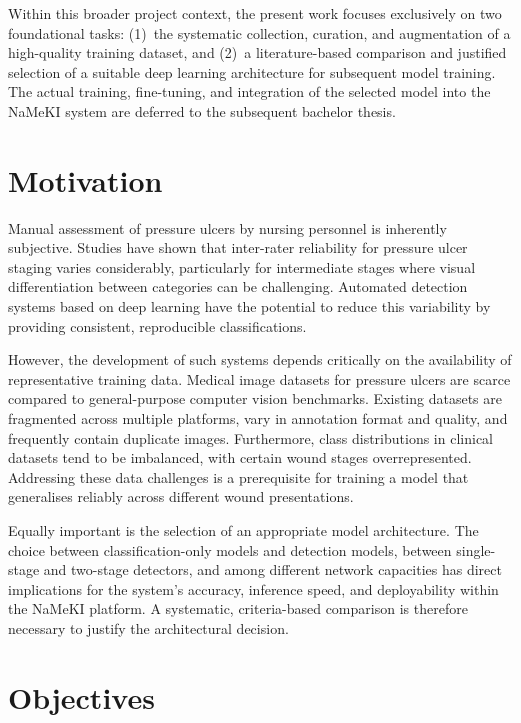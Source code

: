 \documentclass[a4paper,12pt,twoside]{report}
\begin{document}
Within this broader project context, the present work focuses exclusively on two
foundational tasks: (1)~the systematic collection, curation, and augmentation of
a high-quality training dataset, and (2)~a literature-based comparison and
justified selection of a suitable deep learning architecture for subsequent model
training. The actual training, fine-tuning, and integration of the selected model
into the NaMeKI system are deferred to the subsequent bachelor thesis.

\section{Motivation}
\label{sec:motivation}

Manual assessment of pressure ulcers by nursing personnel is inherently
subjective. Studies have shown that inter-rater reliability for pressure ulcer
staging varies considerably, particularly for intermediate stages where visual
differentiation between categories can be challenging. Automated detection
systems based on deep learning have the potential to reduce this variability by
providing consistent, reproducible classifications.

However, the development of such systems depends critically on the availability
of representative training data. Medical image datasets for pressure ulcers are
scarce compared to general-purpose computer vision benchmarks. Existing datasets
are fragmented across multiple platforms, vary in annotation format and quality,
and frequently contain duplicate images. Furthermore, class distributions in
clinical datasets tend to be imbalanced, with certain wound stages
overrepresented. Addressing these data challenges is a prerequisite for training
a model that generalises reliably across different wound presentations.

Equally important is the selection of an appropriate model architecture. The
choice between classification-only models and detection models, between
single-stage and two-stage detectors, and among different network capacities has
direct implications for the system's accuracy, inference speed, and deployability
within the NaMeKI platform. A systematic, criteria-based comparison is therefore
necessary to justify the architectural decision.

\section{Objectives}
\label{sec:objectives}
\end{document}
